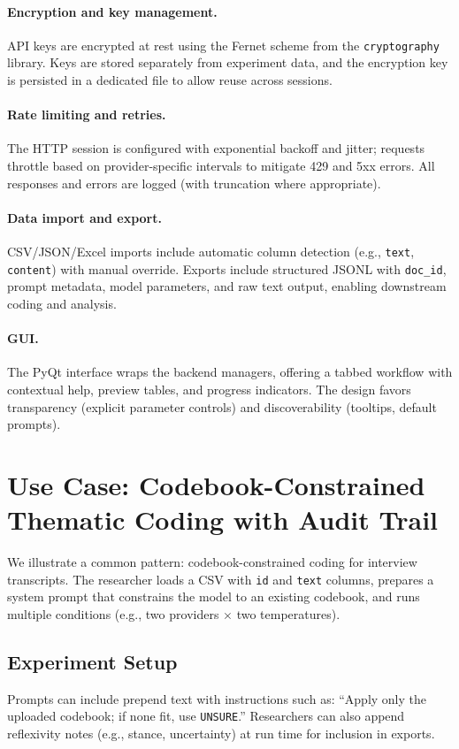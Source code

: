 \documentclass[11pt,a4paper]{article}
\begin{document}
\paragraph{Encryption and key management.} API keys are encrypted at rest using the Fernet scheme from the \texttt{cryptography} library. Keys are stored separately from experiment data, and the encryption key is persisted in a dedicated file to allow reuse across sessions.

\paragraph{Rate limiting and retries.} The HTTP session is configured with exponential backoff and jitter; requests throttle based on provider-specific intervals to mitigate 429 and 5xx errors. All responses and errors are logged (with truncation where appropriate).

\paragraph{Data import and export.} CSV/JSON/Excel imports include automatic column detection (e.g., \texttt{text}, \texttt{content}) with manual override. Exports include structured JSONL with \texttt{doc\_id}, prompt metadata, model parameters, and raw text output, enabling downstream coding and analysis.

\paragraph{GUI.} The PyQt interface wraps the backend managers, offering a tabbed workflow with contextual help, preview tables, and progress indicators. The design favors transparency (explicit parameter controls) and discoverability (tooltips, default prompts).

\section{Use Case: Codebook-Constrained Thematic Coding with Audit Trail}
\label{sec:usecase}
We illustrate a common pattern: codebook-constrained coding for interview transcripts. The researcher loads a CSV with \texttt{id} and \texttt{text} columns, prepares a system prompt that constrains the model to an existing codebook, and runs multiple conditions (e.g., two providers $\times$ two temperatures).

\subsection{Experiment Setup}
Prompts can include prepend text with instructions such as: ``Apply only the uploaded codebook; if none fit, use \texttt{UNSURE}.'' Researchers can also append reflexivity notes (e.g., stance, uncertainty) at run time for inclusion in exports.
\end{document}
